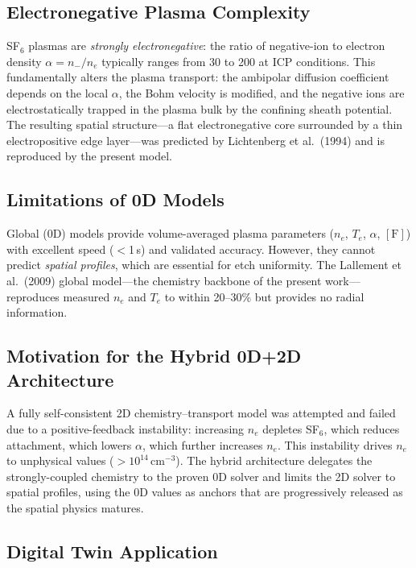 \documentclass[11pt,a4paper]{article}
\renewcommand{\ne}{n_e}
\newcommand{\Te}{T_e}
\begin{document}
\subsection{Electronegative Plasma Complexity}

SF$_6$ plasmas are \emph{strongly electronegative}: the ratio of negative-ion to electron density $\alpha = n_-/\ne$ typically ranges from 30 to 200 at ICP conditions.  This fundamentally alters the plasma transport: the ambipolar diffusion coefficient depends on the local $\alpha$, the Bohm velocity is modified, and the negative ions are electrostatically trapped in the plasma bulk by the confining sheath potential.  The resulting spatial structure---a flat electronegative core surrounded by a thin electropositive edge layer---was predicted by Lichtenberg et al.\ (1994) and is reproduced by the present model.

\subsection{Limitations of 0D Models}

Global (0D) models provide volume-averaged plasma parameters ($\ne$, $\Te$, $\alpha$, $[\mathrm{F}]$) with excellent speed ($<$1\,s) and validated accuracy.  However, they cannot predict \emph{spatial profiles}, which are essential for etch uniformity.  The Lallement et al.\ (2009) global model---the chemistry backbone of the present work---reproduces measured $\ne$ and $\Te$ to within 20--30\% but provides no radial information.

\subsection{Motivation for the Hybrid 0D+2D Architecture}

A fully self-consistent 2D chemistry--transport model was attempted and failed due to a positive-feedback instability: increasing $\ne$ depletes SF$_6$, which reduces attachment, which lowers $\alpha$, which further increases $\ne$.  This instability drives $\ne$ to unphysical values ($>10^{14}$\,cm$^{-3}$).  The hybrid architecture delegates the strongly-coupled chemistry to the proven 0D solver and limits the 2D solver to spatial profiles, using the 0D values as anchors that are progressively released as the spatial physics matures.

\subsection{Digital Twin Application}
\end{document}

